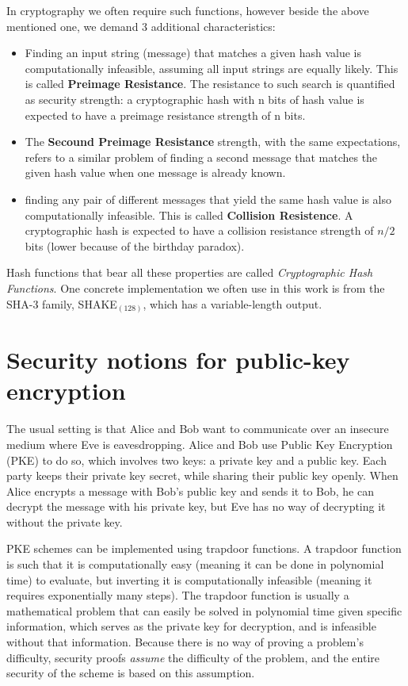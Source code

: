 In cryptography we often require such functions, however beside the above mentioned one, we demand 3 additional characteristics:

\begin{itemize}


\item Finding an input string (message) that matches a given hash value is computationally infeasible, assuming all input strings are equally likely. This is called \textbf{Preimage Resistance}. The resistance to such search is quantified as security strength: a cryptographic hash with n bits of hash value is expected to have a preimage resistance strength of n bits. 

\item The \textbf{Secound Preimage Resistance} strength, with the same expectations, refers to a similar problem of finding a second message that matches the given hash value when one message is already known.

\item finding any pair of different messages that yield the same hash value is also computationally infeasible. This is called \textbf{Collision Resistence}. A cryptographic hash is expected to have a collision resistance strength of $n/2$ bits (lower because of the birthday paradox).

\end{itemize}

Hash functions that bear all these properties are called \emph{Cryptographic Hash Functions}. One concrete implementation we often use in this work is from the SHA-3 family, SHAKE$_(128)$, which has a variable-length output.

\section{Security notions for public-key encryption}

The usual setting is that Alice and Bob want to communicate over an insecure medium where Eve is eavesdropping. Alice and Bob use Public Key Encryption (PKE) to do so, which involves two keys: a private key and a public key. Each party keeps their private key secret, while sharing their public key openly. When Alice encrypts a message with Bob's public key and sends it to Bob, he can decrypt the message with his private key, but Eve has no way of decrypting it without the private key.

PKE schemes can be implemented using trapdoor functions. A trapdoor function is such that it is computationally easy (meaning it can be done in polynomial time) to evaluate, but inverting it is computationally infeasible (meaning it requires exponentially many steps). The trapdoor function is usually a mathematical problem that can easily be solved in polynomial time given specific information, which serves as the private key for decryption, and is infeasible without that information. Because there is no way of proving a problem's difficulty, security proofs \textit{assume} the difficulty of the problem, and the entire security of the scheme is based on this assumption.

